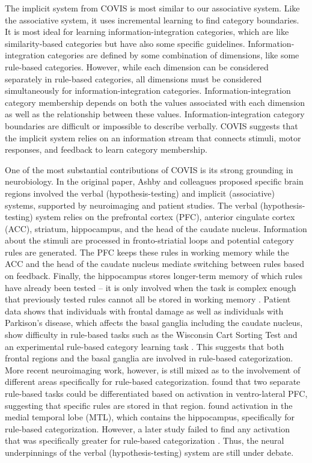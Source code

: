 \documentclass[../dissertation.tex]{subfiles}
\begin{document}
	The implicit system from COVIS is most similar to our associative system. Like the associative system, it uses incremental learning to find category boundaries. It is most ideal for learning information-integration categories, which are like similarity-based categories but have also some specific guidelines. Information-integration categories are defined by some combination of dimensions, like some rule-based categories. However, while each dimension can be considered separately in rule-based categories, all dimensions must be considered simultaneously for information-integration categories. Information-integration category membership depends on both the values associated with each dimension as well as the relationship between these values. Information-integration category boundaries are difficult or impossible to describe verbally. COVIS suggests that the implicit system relies on an information stream that connects stimuli, motor responses, and feedback to learn category membership. \par
	One of the most substantial contributions of COVIS is its strong grounding in neurobiology. In the original paper, Ashby and colleagues proposed specific brain regions involved the verbal (hypothesis-testing) and implicit (associative) systems, supported by neuroimaging and patient studies. The verbal (hypothesis-testing) system relies on the prefrontal cortex (PFC), anterior cingulate cortex (ACC), striatum, hippocampus, and the head of the caudate nucleus. Information about the stimuli are processed in fronto-striatial loops and potential category rules are generated. The PFC keeps these rules in working memory while the ACC and the head of the caudate nucleus mediate switching between rules based on feedback. Finally, the hippocampus stores longer-term memory of which rules have already been tested – it is only involved when the task is complex enough that previously tested rules cannot all be stored in working memory \citep{Ashby2005,Ashby2011}. Patient data shows that individuals with frontal damage as well as individuals with Parkison's disease, which affects the basal ganglia including the caudate nucleus, show difficulty in rule-based tasks such as the Wisconsin Cart Sorting Test \citep{Robinson1980} and an experimental rule-based category learning task \citep{Ashby2003b}. This suggests that both frontal regions and the basal ganglia are involved in rule-based categorization. More recent neuroimaging work, however, is still mixed as to the involvement of different areas specifically for rule-based categorization. \citet{Soto2013} found that two separate rule-based tasks could be differentiated based on activation in ventro-lateral PFC, suggesting that specific rules are stored in that region. \citet{Nomura2007} found activation in the medial temporal lobe (MTL), which contains the hippocampus, specifically for rule-based categorization. However, a later study failed to find any activation that was specifically greater for rule-based categorization \citep{Carpenter2016}. Thus, the neural underpinnings of the verbal (hypothesis-testing) system are still under debate. \par
\end{document}
